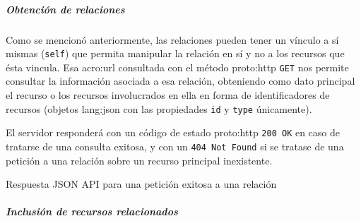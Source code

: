 \subparagraph{Obtención de relaciones}

Como se mencionó anteriormente, las relaciones pueden tener un vínculo a sí mismas (\texttt{self}) que permita manipular la relación en sí y no a los recursos que ésta vincula. Esa \gls{acro:url} consultada con el método \gls{proto:http} \texttt{GET} nos permite consultar la información asociada a esa relación, obteniendo como dato principal el recurso o los recursos involucrados en ella en forma de identificadores de recursos (objetos \gls{lang:json} con las propiedades \texttt{id} y \texttt{type} únicamente).

El servidor responderá con un código de estado \gls{proto:http} \texttt{200 OK} en caso de tratarse de una consulta exitosa, y con un \texttt{404 Not Found} si se tratase de una petición a una relación sobre un recurso principal inexistente.

\begin{listing}
  \caption{Respuesta JSON API para una petición exitosa a una relación}
  \label{soa:tecnologias:json-api:respuesta-200-obtener-relacion}
\end{listing}

\subparagraph{Inclusión de recursos relacionados}

